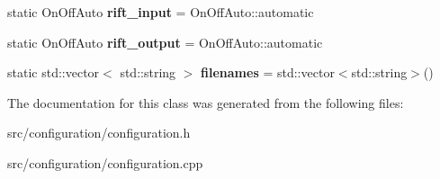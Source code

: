 \begin{DoxyCompactItemize}
\item 
\hypertarget{class_configuration_adee222d35cf8c4018ba8936bb0342e8d}{}static On\+Off\+Auto {\bfseries rift\+\_\+input} = On\+Off\+Auto\+::automatic\label{class_configuration_adee222d35cf8c4018ba8936bb0342e8d}

\item 
\hypertarget{class_configuration_af34cb34a11944c560d857e00806b19e7}{}static On\+Off\+Auto {\bfseries rift\+\_\+output} = On\+Off\+Auto\+::automatic\label{class_configuration_af34cb34a11944c560d857e00806b19e7}

\item 
\hypertarget{class_configuration_a276e49ee4475e11a0cf199e8c5c689f3}{}static std\+::vector$<$ std\+::string $>$ {\bfseries filenames} = std\+::vector$<$std\+::string$>$()\label{class_configuration_a276e49ee4475e11a0cf199e8c5c689f3}

\end{DoxyCompactItemize}


The documentation for this class was generated from the following files\+:\begin{DoxyCompactItemize}
\item 
src/configuration/configuration.\+h\item 
src/configuration/configuration.\+cpp\end{DoxyCompactItemize}
